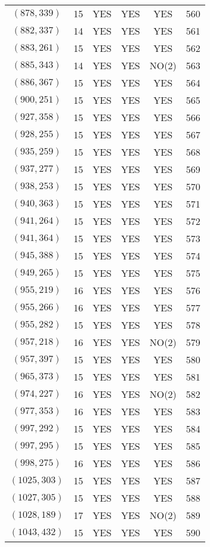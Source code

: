 \begin{longtable}{|c|c|c|c|c|c|}
$(878, 339)$ & 15 & YES & YES & YES & 560\\
$(882, 337)$ & 14 & YES & YES & YES & 561\\
$(883, 261)$ & 15 & YES & YES & YES & 562\\
$(885, 343)$ & 14 & YES & YES & NO(2) & 563\\
$(886, 367)$ & 15 & YES & YES & YES & 564\\
$(900, 251)$ & 15 & YES & YES & YES & 565\\
$(927, 358)$ & 15 & YES & YES & YES & 566\\
$(928, 255)$ & 15 & YES & YES & YES & 567\\
$(935, 259)$ & 15 & YES & YES & YES & 568\\
$(937, 277)$ & 15 & YES & YES & YES & 569\\
$(938, 253)$ & 15 & YES & YES & YES & 570\\
$(940, 363)$ & 15 & YES & YES & YES & 571\\
$(941, 264)$ & 15 & YES & YES & YES & 572\\
$(941, 364)$ & 15 & YES & YES & YES & 573\\
$(945, 388)$ & 15 & YES & YES & YES & 574\\
$(949, 265)$ & 15 & YES & YES & YES & 575\\
$(955, 219)$ & 16 & YES & YES & YES & 576\\
$(955, 266)$ & 16 & YES & YES & YES & 577\\
$(955, 282)$ & 15 & YES & YES & YES & 578\\
$(957, 218)$ & 16 & YES & YES & NO(2) & 579\\
$(957, 397)$ & 15 & YES & YES & YES & 580\\
$(965, 373)$ & 15 & YES & YES & YES & 581\\
$(974, 227)$ & 16 & YES & YES & NO(2) & 582\\
$(977, 353)$ & 16 & YES & YES & YES & 583\\
$(997, 292)$ & 15 & YES & YES & YES & 584\\
$(997, 295)$ & 15 & YES & YES & YES & 585\\
$(998, 275)$ & 16 & YES & YES & YES & 586\\
$(1025, 303)$ & 15 & YES & YES & YES & 587\\
$(1027, 305)$ & 15 & YES & YES & YES & 588\\
$(1028, 189)$ & 17 & YES & YES & NO(2) & 589\\
$(1043, 432)$ & 15 & YES & YES & YES & 590\\

\end{longtable}

